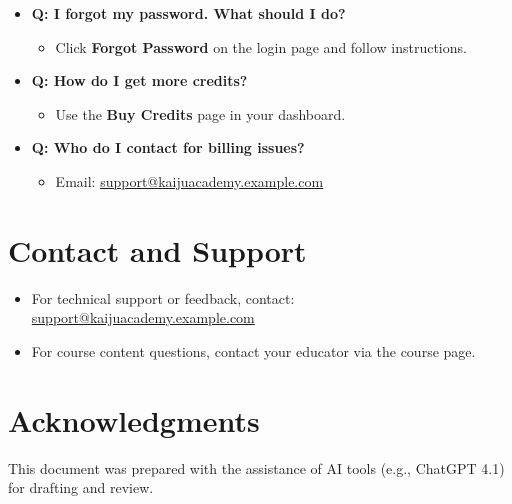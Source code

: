 \documentclass[a4paper,11pt]{scrartcl}
\begin{document}
\begin{itemize}[leftmargin=*]
    \item \textbf{Q: I forgot my password. What should I do?}
    \begin{itemize}
        \item Click \textbf{Forgot Password} on the login page and follow instructions.
    \end{itemize}
    \item \textbf{Q: How do I get more credits?}
    \begin{itemize}
        \item Use the \textbf{Buy Credits} page in your dashboard.
    \end{itemize}
    \item \textbf{Q: Who do I contact for billing issues?}
    \begin{itemize}
        \item Email: \href{mailto:support@kaijuacademy.example.com}{support@kaijuacademy.example.com}
    \end{itemize}
\end{itemize}

\section{Contact and Support}

\begin{itemize}[leftmargin=*]
    \item For technical support or feedback, contact: \href{mailto:support@kaijuacademy.example.com}{support@kaijuacademy.example.com}
    \item For course content questions, contact your educator via the course page.
\end{itemize}

\section{Acknowledgments}
This document was prepared with the assistance of AI tools (e.g., ChatGPT 4.1) for drafting and review.
\end{document}
